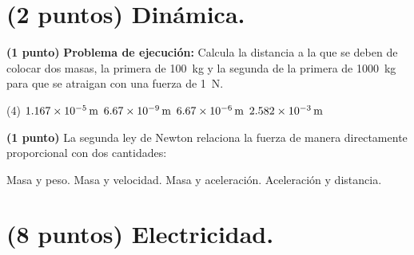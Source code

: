 \documentclass[12pt, letter]{exam}
\begin{document}


\newpage

\begin{questions}
    \section{(2 puntos) Dinámica.}

    \question \textbf{(1 punto)} \label{Problema_01} \textbf{Problema de ejecución: } Calcula la distancia a la que se deben de colocar dos masas, la primera de \SI{100}{\kilo\gram} y la segunda de la primera de \SI{1000}{\kilo\gram} para que se atraigan con una fuerza de \SI{1}{\newton}.
    \begin{tasks}(4)
        \task $\SI{1.167d-5}{\meter}$
        \task $\SI{6.67d-9}{\meter}$
        \task $\SI{6.67d-6}{\meter}$
        \task $\SI{2.582d-3}{\meter}$
    \end{tasks}
    \question \textbf{(1 punto)} La segunda ley de Newton relaciona la fuerza de manera directamente proporcional con dos cantidades:
    \begin{multicols}{2}
    \begin{tasks}
        \task Masa y peso.
        \task Masa y velocidad.
        \task Masa y aceleración.
        \task Aceleración y distancia.
    \end{tasks}
    \end{multicols}
    

    \section{(8 puntos) Electricidad.}


\end{questions}
\end{document}
